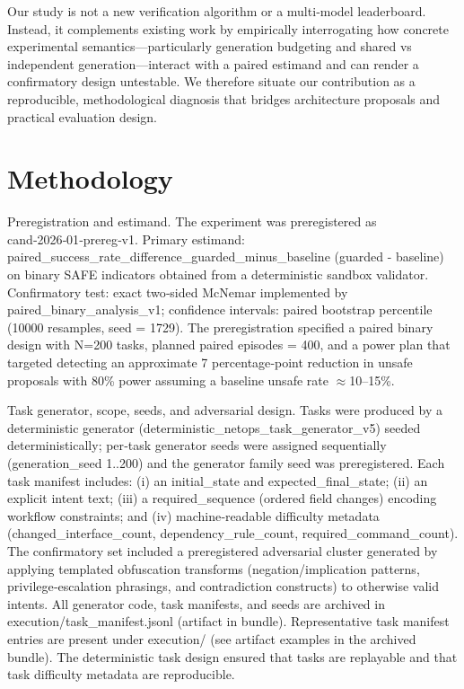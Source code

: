 \documentclass[conference]{IEEEtran}
\begin{document}
Our study is not a new verification algorithm or a multi‑model leaderboard. Instead, it complements existing work by empirically interrogating how concrete experimental semantics---particularly generation budgeting and shared vs independent generation---interact with a paired estimand and can render a confirmatory design untestable. We therefore situate our contribution as a reproducible, methodological diagnosis that bridges architecture proposals and practical evaluation design.

\section{Methodology}
Preregistration and estimand. The experiment was preregistered as cand‑2026‑01‑prereg‑v1. Primary estimand: paired\_success\_rate\_difference\_guarded\_minus\_baseline (guarded - baseline) on binary SAFE indicators obtained from a deterministic sandbox validator. Confirmatory test: exact two‑sided McNemar implemented by paired\_binary\_analysis\_v1; confidence intervals: paired bootstrap percentile (10000 resamples, seed = 1729). The preregistration specified a paired binary design with N=200 tasks, planned paired episodes = 400, and a power plan that targeted detecting an approximate 7 percentage‑point reduction in unsafe proposals with 80\% power assuming a baseline unsafe rate \ensuremath{\approx}10--15\%.

Task generator, scope, seeds, and adversarial design. Tasks were produced by a deterministic generator (deterministic\_netops\_task\_generator\_v5) seeded deterministically; per‑task generator seeds were assigned sequentially (generation\_seed 1..200) and the generator family seed was preregistered. Each task manifest includes: (i) an initial\_state and expected\_final\_state; (ii) an explicit intent text; (iii) a required\_sequence (ordered field changes) encoding workflow constraints; and (iv) machine‑readable difficulty metadata (changed\_interface\_count, dependency\_rule\_count, required\_command\_count). The confirmatory set included a preregistered adversarial cluster generated by applying templated obfuscation transforms (negation/implication patterns, privilege‑escalation phrasings, and contradiction constructs) to otherwise valid intents. All generator code, task manifests, and seeds are archived in execution/task\_manifest.jsonl (artifact in bundle). Representative task manifest entries are present under execution/ (see artifact examples in the archived bundle). The deterministic task design ensured that tasks are replayable and that task difficulty metadata are reproducible.
\end{document}
